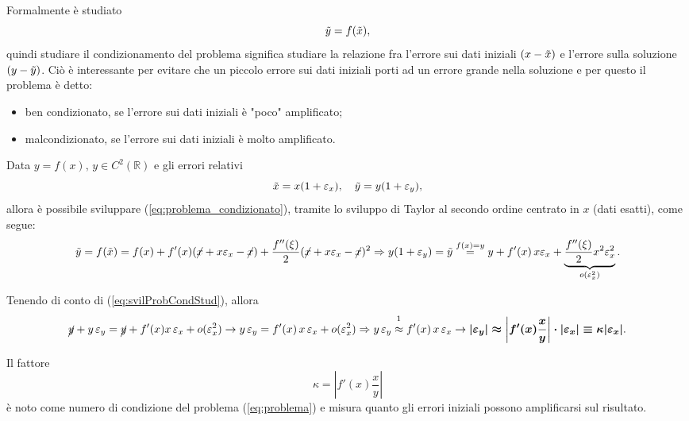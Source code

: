 Formalmente è studiato
\begin{equation}\label{eq:problema_condizionato}
	\Tilde{y}=f(\Tilde{x}),
\end{equation}
quindi studiare il condizionamento del problema significa studiare la relazione fra l'errore sui dati iniziali $(x-\Tilde{x})$ e l'errore sulla soluzione $(y-\Tilde{y})$. Ciò è interessante per evitare che un piccolo errore sui dati iniziali porti ad un errore grande nella soluzione e per questo il problema è detto:
\begin{itemize}
	\item ben condizionato, se l'errore sui dati iniziali è "poco" amplificato;
	\item malcondizionato, se l'errore sui dati iniziali è molto amplificato.
\end{itemize}

Data $y=f(x),\, y\in C^2(\mathbb{R})$ e gli errori relativi \begin{equation*}
	\Tilde{x}=x(1+\varepsilon_x),\quad \Tilde{y}=y(1+\varepsilon_y),
\end{equation*}
allora è possibile sviluppare (\ref{eq:problema_condizionato}), tramite lo sviluppo di Taylor al secondo ordine centrato in $x$ (dati esatti), come segue:
\begin{equation}\label{eq:svilProbCondStud}
	\Tilde{y}=f(\Tilde{x})=f(x)+f'(x)(\cancel{x}+x\varepsilon_x-\cancel{x})+\frac{f''(\xi)}{2}(\cancel{x}+x\varepsilon_x-\cancel{x})^2\Rightarrow y(1+\varepsilon_y)=\Tilde{y}\overset{f(x)=y}{=}y+f'(x)\, x\varepsilon_x+\underbrace{\frac{f''(\xi)}{2}x^2\varepsilon_x^2}_{o(\varepsilon_x^2)}.
\end{equation}

Tenendo di conto di (\ref{eq:svilProbCondStud}), allora
\begin{equation*}
	\cancel{y}+y\,\varepsilon_y=\cancel{y}+f'(x)x\,\varepsilon_x+o(\varepsilon_x^2)\rightarrow y\,\varepsilon_y=f'(x)\,x\,\varepsilon_x+o(\varepsilon_x^2)\Rightarrow y\,\varepsilon_y \overset{\footnotemark}{\approx}f'(x)\,x\,\varepsilon_x \rightarrow \boldsymbol{|\varepsilon_y|\approx \left|f'(x)\frac{x}{y}\right|\cdot|\varepsilon_x|\equiv\kappa |\varepsilon_x|}.
\end{equation*}


\begin{definition}\label{def:condizionamento_problema}
	Il fattore
	\begin{equation*}
		\kappa = \left|f'(x)\frac{x}{y}\right|
	\end{equation*}
	è noto come numero di condizione del problema (\ref{eq:problema}) e misura quanto gli errori iniziali possono amplificarsi sul risultato.
\end{definition}

